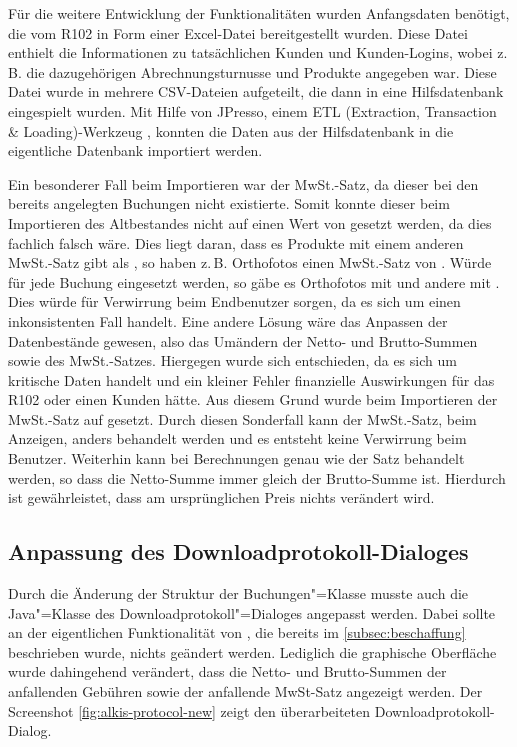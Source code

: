 Für die weitere Entwicklung der Funktionalitäten wurden Anfangsdaten benötigt, die vom R102 in Form einer Excel-Datei bereitgestellt wurden.
Diese Datei enthielt die Informationen zu tatsächlichen Kunden und Kunden-Logins, wobei z.\,B. die dazugehörigen Abrechnungsturnusse und Produkte angegeben war.
Diese Datei wurde in mehrere \acs{CSV}-Dateien aufgeteilt, die dann in eine Hilfsdatenbank eingespielt wurden.
Mit Hilfe von JPresso, einem  ETL (Extraction, Transaction \& Loading)-Werkzeug \autocite[vgl.][]{cismet-jpresso}, konnten die Daten aus der Hilfsdatenbank in die eigentliche Datenbank importiert werden.

Ein besonderer Fall beim Importieren war der MwSt.-Satz, da dieser bei den bereits angelegten Buchungen nicht existierte.
Somit konnte dieser beim Importieren des Altbestandes nicht auf einen Wert von  gesetzt werden, da dies fachlich falsch wäre.
Dies liegt daran, dass es Produkte mit einem anderen MwSt.-Satz gibt als , so haben z.\,B. Orthofotos einen MwSt.-Satz von .
Würde für jede Buchung  eingesetzt werden, so gäbe es Orthofotos mit  und andere mit .
Dies würde für Verwirrung beim Endbenutzer sorgen, da es sich um einen inkonsistenten Fall handelt.
Eine andere Lösung wäre das Anpassen der Datenbestände gewesen, also das Umändern der Netto- und Brutto-Summen sowie des MwSt.-Satzes. 
Hiergegen wurde sich entschieden, da es sich um kritische Daten handelt und ein kleiner Fehler finanzielle Auswirkungen für das R102 oder einen Kunden hätte.
Aus diesem Grund wurde beim Importieren der MwSt.-Satz auf  gesetzt.
Durch diesen Sonderfall kann der MwSt.-Satz, beim Anzeigen, anders behandelt werden und es entsteht keine Verwirrung beim Benutzer.
Weiterhin kann bei Berechnungen  genau wie der Satz  behandelt werden, so dass die Netto-Summe immer gleich der Brutto-Summe ist.
Hierdurch ist gewährleistet, dass am ursprünglichen Preis nichts verändert wird.


\subsection{Anpassung des Downloadprotokoll-Dialoges}
Durch die Änderung der Struktur der Buchungen"=Klasse musste auch die Java"=Klasse des Downloadprotokoll"=Dialoges  angepasst werden.
Dabei sollte an der eigentlichen Funktionalität von , die bereits im \autoref{subsec:beschaffung} beschrieben wurde, nichts geändert werden.
Lediglich die graphische Oberfläche wurde dahingehend verändert, dass die Netto- und Brutto-Summen der anfallenden Gebühren sowie der anfallende MwSt-Satz angezeigt werden.
Der Screenshot \ref{fig:alkis-protocol-new} zeigt den überarbeiteten Downloadprotokoll-Dialog.

